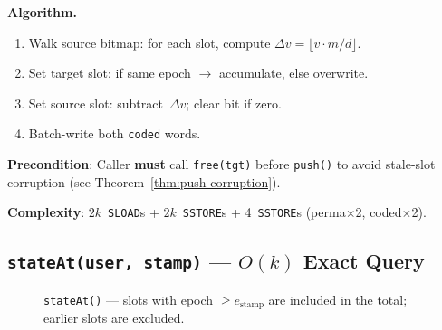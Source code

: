 \documentclass[10pt,a4paper,twocolumn]{article}
\theoremstyle{definition}
\theoremstyle{plain}
\theoremstyle{remark}
\begin{document}
\textbf{Algorithm.}
\begin{enumerate}[leftmargin=*, nosep]
\item Walk source bitmap: for each slot, compute $\Delta v = \lfloor v \cdot m / d \rfloor$.
\item Set target slot: if same epoch $\to$ accumulate, else overwrite.
\item Set source slot: subtract~$\Delta v$; clear bit if zero.
\item Batch-write both \texttt{coded} words.
\end{enumerate}

\textbf{Precondition}: Caller \textbf{must} call \texttt{free(tgt)} before \texttt{push()} to avoid stale-slot corruption (see Theorem~\ref{thm:push-corruption}).

\textbf{Complexity}: $2k$~\texttt{SLOAD}s + $2k$~\texttt{SSTORE}s + 4~\texttt{SSTORE}s (perma$\times$2, coded$\times$2).

\subsection{\texttt{stateAt(user, stamp)} --- $O(k)$ Exact Query}
\label{subsec:stateat}

\begin{figure}[htbp]
\centering
{}
\caption{\texttt{stateAt()} --- slots with epoch $\geq e_{\text{stamp}}$ are included in the total; earlier slots are excluded.}
\label{fig:stateat}
\end{figure}
\end{document}
